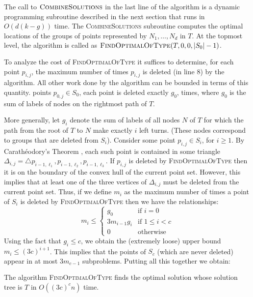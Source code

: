 \documentclass[lotsofwhite]{patmorin}
\begin{document}
The call to $\textsc{CombineSolutions}$ in the last line of the
algorithm is a dynamic programming subroutine described in the next
section that runs in $O(d(k-g))$ time.  The \textsc{CombineSolutions}
subroutine computes the optimal locations of the groups of points
represented by $N_1,\ldots,N_d$ in $T$.  At the topmost level, the
algorithm is called as $\textsc{FindOptimalOfType}(T,0,0,|S_0|-1)$.

To analyze the cost of \textsc{FindOptimalOfType} it suffices to
determine, for each point $p_{i,j}$, the maximum number of times
$p_{i,j}$ is deleted (in line 8) by the algorithm.  All other work
done by the algorithm can be bounded in terms of this quantity.
points $p_{0,j}\in S_0$, each point is deleted exactly $g_0$, times,
where $g_0$ is the sum of labels of nodes on the rightmost path of
$T$. 

More generally, let $g_i$ denote the sum of labels of all nodes $N$ of
$T$ for which the path from the root of $T$ to $N$ make exactly $i$
left turns. (These nodes correspond to groups that are deleted from
$S_i$).  Consider some point $p_{i,j}\in S_i$, for $i\ge 1$.  By
Carath\'eodory's Theorem \cite{eckhoff93}, each such point is contained
in some triangle $\Delta_{i,j}=\triangle
p_{i-1,\ell_1},p_{i-1,\ell_2},p_{i-1,\ell_3}$. If $p_{i,j}$ is deleted
by \textsc{FindOptimalOfType} then it is on the boundary of the convex
hull of the current point set.  However, this implies that at least
one of the three vertices of $\Delta_{i,j}$ must be deleted from the
current point set.  Thus, if we define $m_i$ as the maximum number of
times a point of $S_i$ is deleted by \textsc{FindOptimalOfType} then
we have the relationships:
\[ 
    m_i \le \left\{\begin{array}{ll}
            g_0 & \mbox{if $i=0$} \\
            3 m_{i-1} g_i & \mbox{if $1\le i< c$} \\
            0 & \mbox{otherwise}      
        \end{array}\right.
\] 
Using the fact that $g_i \le c$, we obtain the (extremely loose) upper
bound $m_i \le (3c)^{i+1}$.  
This implies that the points of $S_c$
(which are never deleted) appear in at most $3m_{c-1}$ subproblems.
Putting all this together we obtain:

\begin{lem}
The algorithm \textsc{FindOptimalOfType} finds the optimal solution
whose solution tree is $T$ in $O((3c)^c n)$ time.
\end{lem}
\end{document}
